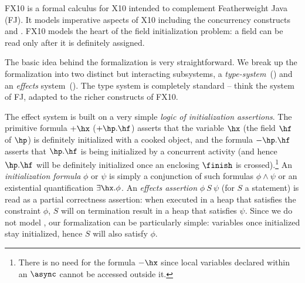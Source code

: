 FX10 is a formal calculus for X10 intended to  complement Featherweight Java
(FJ).  It models imperative aspects of X10 including the concurrency
constructs \finish{} and \async{}.
FX10 models the heart of the field initialization problem:
    a field can be read only after it  is definitely assigned.


The basic idea behind the formalization is very straightforward. We
break up the formalization into two distinct but interacting
subsystems, a {\em type-system}~() and an {\em
  effects} system~(). The type
system is completely standard -- think the system of FJ, adapted to
the richer constructs of FX10.

The effect system is built on a very simple {\em logic of
  initialization assertions}.  The primitive formula $+\hx$
($+\hp.\hf$) asserts that the variable $\hx$ (the field $\hf$ of
$\hp$) is definitely initialized with a cooked object, and the formula
$-\hp.\hf$ asserts that $\hp.\hf$ is being initialized by a concurrent
activity (and hence $\hp.\hf$ will be definitely initialized once an
enclosing $\finish$ is crossed).\footnote{There is no need for the
  formula $-\hx$ since local variables declared within an $\async$
  cannot be accessed outside it.}  An {\em initialization formula}
$\phi$ or $\psi$ is simply a conjunction of such formulas $\phi \wedge
\psi$ or an existential quantification $\exists{}\hx.\phi$.
An {\em
  effects assertion} $\phi~S~\psi$ (for $S$ a statement) is read as a
partial correctness assertion: when executed in a heap that satisfies
the constraint $\phi$, $S$ will on termination result in a heap that
satisfies $\psi$.  Since we do not model , our
formalization can be particularly simple: variables once initialized
stay initialized, hence $S$ will also satisfy $\phi$.

